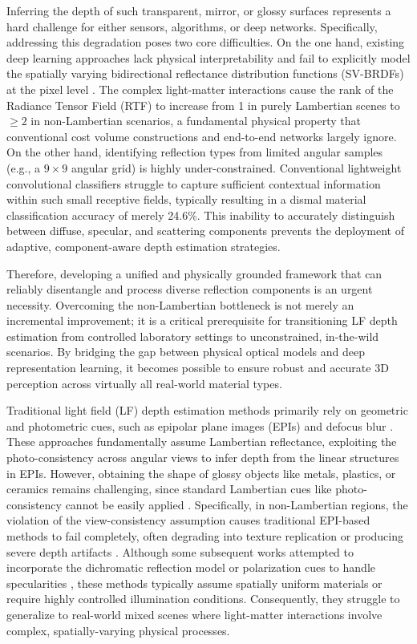\documentclass[journal]{IEEEtran}
\begin{document}
Inferring the depth of such transparent, mirror, or glossy surfaces represents a hard challenge for either sensors, algorithms, or deep networks. Specifically, addressing this degradation poses two core difficulties. On the one hand, existing deep learning approaches lack physical interpretability and fail to explicitly model the spatially varying bidirectional reflectance distribution functions (SV-BRDFs) at the pixel level . The complex light-matter interactions cause the rank of the Radiance Tensor Field (RTF) to increase from 1 in purely Lambertian scenes to \(\geq 2\) in non-Lambertian scenarios, a fundamental physical property that conventional cost volume constructions and end-to-end networks largely ignore. On the other hand, identifying reflection types from limited angular samples (e.g., a \(9 \times 9\) angular grid) is highly under-constrained. Conventional lightweight convolutional classifiers struggle to capture sufficient contextual information within such small receptive fields, typically resulting in a dismal material classification accuracy of merely 24.6\%. This inability to accurately distinguish between diffuse, specular, and scattering components prevents the deployment of adaptive, component-aware depth estimation strategies.

Therefore, developing a unified and physically grounded framework that can reliably disentangle and process diverse reflection components is an urgent necessity. Overcoming the non-Lambertian bottleneck is not merely an incremental improvement; it is a critical prerequisite for transitioning LF depth estimation from controlled laboratory settings to unconstrained, in-the-wild scenarios. By bridging the gap between physical optical models and deep representation learning, it becomes possible to ensure robust and accurate 3D perception across virtually all real-world material types.

Traditional light field (LF) depth estimation methods primarily rely on geometric and photometric cues, such as epipolar plane images (EPIs) and defocus blur . These approaches fundamentally assume Lambertian reflectance, exploiting the photo-consistency across angular views to infer depth from the linear structures in EPIs. However, obtaining the shape of glossy objects like metals, plastics, or ceramics remains challenging, since standard Lambertian cues like photo-consistency cannot be easily applied . Specifically, in non-Lambertian regions, the violation of the view-consistency assumption causes traditional EPI-based methods to fail completely, often degrading into texture replication or producing severe depth artifacts . Although some subsequent works attempted to incorporate the dichromatic reflection model or polarization cues to handle specularities , these methods typically assume spatially uniform materials or require highly controlled illumination conditions. Consequently, they struggle to generalize to real-world mixed scenes where light-matter interactions involve complex, spatially-varying physical processes.
\end{document}
